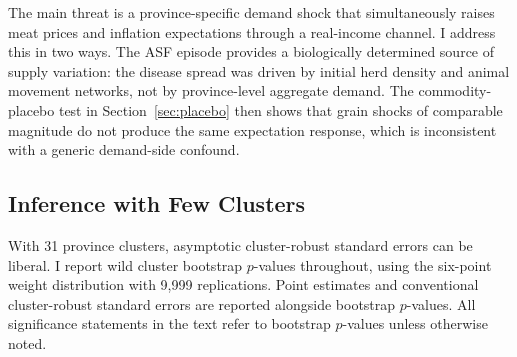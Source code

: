 The main threat is a province-specific demand shock that
simultaneously raises meat prices and inflation expectations through
a real-income channel.
I address this in two ways.
The ASF episode provides a biologically determined source of
supply variation: the disease spread was driven by initial herd
density and animal movement networks, not by province-level
aggregate demand.
The commodity-placebo test in Section~\ref{sec:placebo}
then shows that grain shocks of comparable magnitude do not produce
the same expectation response, which is inconsistent with a generic
demand-side confound.

\subsection{Inference with Few Clusters}
\label{sec:inference}

With 31 province clusters, asymptotic cluster-robust standard
errors can be liberal.
I report wild cluster bootstrap $p$-values throughout, using
the \citet{Webb2023} six-point weight distribution with 9,999
replications.
Point estimates and conventional cluster-robust standard errors
are reported alongside bootstrap $p$-values.
All significance statements in the text refer to bootstrap
$p$-values unless otherwise noted.
